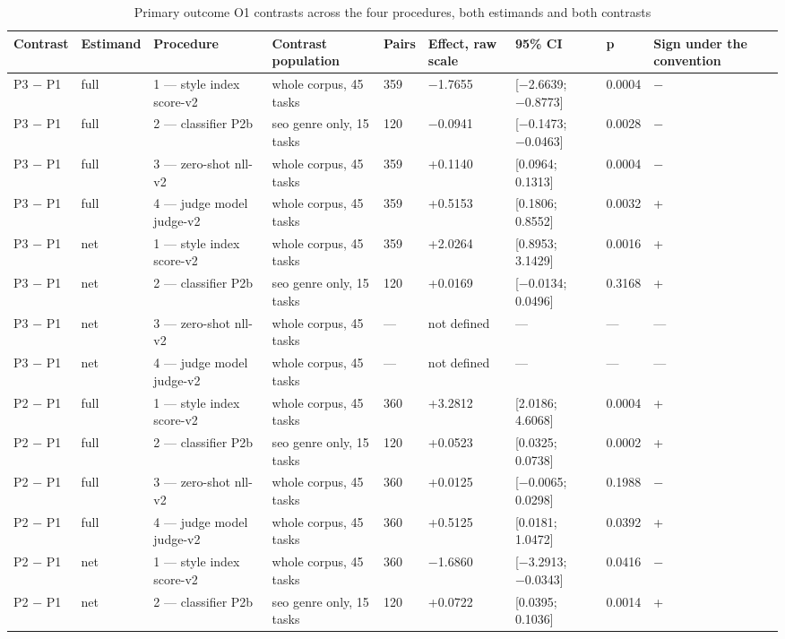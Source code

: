 \begin{table}
\centering
\scriptsize
\caption{Primary outcome O1 contrasts across the four procedures, both estimands and both contrasts}
\label{tab:3}
\begin{tabular}{lllllllll}
\toprule
Contrast & Estimand & Procedure & Contrast population & Pairs & Effect, raw scale & 95\% CI & p & Sign under the convention \\
\midrule
P3 − P1 & full & 1 — style index score-v2 & whole corpus, 45 tasks & 359 & −1.7655 & [−2.6639; −0.8773] & 0.0004 & − \\
P3 − P1 & full & 2 — classifier P2b & seo genre only, 15 tasks & 120 & −0.0941 & [−0.1473; −0.0463] & 0.0028 & − \\
P3 − P1 & full & 3 — zero-shot nll-v2 & whole corpus, 45 tasks & 359 & +0.1140 & [0.0964; 0.1313] & 0.0004 & − \\
P3 − P1 & full & 4 — judge model judge-v2 & whole corpus, 45 tasks & 359 & +0.5153 & [0.1806; 0.8552] & 0.0032 & + \\
P3 − P1 & net & 1 — style index score-v2 & whole corpus, 45 tasks & 359 & +2.0264 & [0.8953; 3.1429] & 0.0016 & + \\
P3 − P1 & net & 2 — classifier P2b & seo genre only, 15 tasks & 120 & +0.0169 & [−0.0134; 0.0496] & 0.3168 & + \\
P3 − P1 & net & 3 — zero-shot nll-v2 & whole corpus, 45 tasks & — & not defined & — & — & — \\
P3 − P1 & net & 4 — judge model judge-v2 & whole corpus, 45 tasks & — & not defined & — & — & — \\
P2 − P1 & full & 1 — style index score-v2 & whole corpus, 45 tasks & 360 & +3.2812 & [2.0186; 4.6068] & 0.0004 & + \\
P2 − P1 & full & 2 — classifier P2b & seo genre only, 15 tasks & 120 & +0.0523 & [0.0325; 0.0738] & 0.0002 & + \\
P2 − P1 & full & 3 — zero-shot nll-v2 & whole corpus, 45 tasks & 360 & +0.0125 & [−0.0065; 0.0298] & 0.1988 & − \\
P2 − P1 & full & 4 — judge model judge-v2 & whole corpus, 45 tasks & 360 & +0.5125 & [0.0181; 1.0472] & 0.0392 & + \\
P2 − P1 & net & 1 — style index score-v2 & whole corpus, 45 tasks & 360 & −1.6860 & [−3.2913; −0.0343] & 0.0416 & − \\
P2 − P1 & net & 2 — classifier P2b & seo genre only, 15 tasks & 120 & +0.0722 & [0.0395; 0.1036] & 0.0014 & + \\

\end{tabular}
\end{table}
